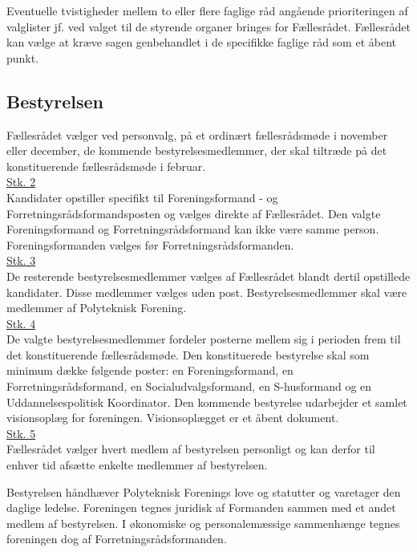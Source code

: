 \begin{list}
\item Eventuelle tvistigheder mellem to eller flere faglige råd angående prioriteringen af valglister jf.  ved valget til de styrende organer bringes for Fællesrådet. Fællesrådet kan vælge at kræve sagen genbehandlet i de specifikke faglige råd som et åbent punkt.\\

\subsection{Bestyrelsen}
\label{L:kap:bestyrelsen}
\item \label{L:best:valg} Fællesrådet vælger ved personvalg, på et ordinært fællesrådsmøde i november eller december, de kommende bestyrelsesmedlemmer, der skal tiltræde på det konstituerende fællesrådsmøde i februar.\\

\underline{Stk. 2}\\
Kandidater opstiller specifikt til Foreningsformand - og Forretningsrådsformandsposten og vælges direkte af Fællesrådet. Den valgte Foreningsformand og Forretningsrådsformand kan ikke være samme person. Foreningsformanden vælges før Forretningsrådsformanden.\\

\underline{Stk. 3}\\
De resterende bestyrelsesmedlemmer vælges af Fællesrådet blandt dertil opstillede kandidater. Disse medlemmer vælges uden post. Bestyrelsesmedlemmer skal være medlemmer af Polyteknisk Forening.\\

\underline{Stk. 4}\\
De valgte bestyrelsesmedlemmer fordeler posterne mellem sig i perioden frem til det konstituerende fællesrådsmøde. Den konstituerede bestyrelse skal som minimum dække følgende poster: en Foreningsformand, en Forretningsrådsformand, en Socialudvalgsformand, en S-husformand og en Uddannelsespolitisk Koordinator. Den kommende bestyrelse udarbejder et samlet visionsoplæg for foreningen. Visionsoplægget er et åbent dokument.\\

\underline{Stk. 5}\\ 
Fællesrådet vælger hvert medlem af bestyrelsen personligt og kan derfor til enhver tid afsætte enkelte medlemmer af bestyrelsen.\\

\item Bestyrelsen håndhæver Polyteknisk Forenings love og statutter og varetager den daglige ledelse. Foreningen tegnes juridisk af Formanden sammen med et andet medlem af bestyrelsen. I økonomiske og personalemæssige sammenhænge tegnes foreningen dog af Forretningsrådsformanden.\\


\end{list}
